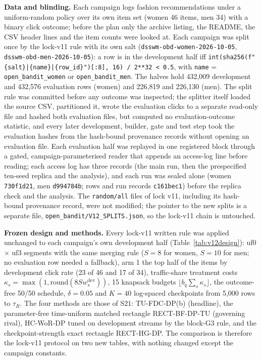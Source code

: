 \documentclass[sigconf,anonymous,review]{acmart}
\begin{document}
\textbf{Data and blinding.} Each campaign logs fashion recommendations under a uniform-random policy over its own item set (women 46 items, men 34) with a binary click outcome; before the plan only the archive listing, the README, the CSV header lines and the item counts were looked at. Each campaign was split once by the lock-v11 rule with its own salt (\texttt{dsswm-obd-women-2026-10-05}, \texttt{dsswm-obd-men-2026-10-05}): a row is in the development half iff \texttt{int(sha256(f"\{salt\}|\{name\}|\{row\_id\}")[:8], 16) / 2**32 < 0.5}, with \texttt{name} = \texttt{open\_bandit\_women} or \texttt{open\_bandit\_men}. The halves hold 432,009 development and 432,576 evaluation rows (women) and 226,819 and 226,130 (men). The split rule was committed before any outcome was inspected; the splitter itself loaded the source CSV, partitioned it, wrote the evaluation clicks to a separate read-only file and hashed both evaluation files, but computed no evaluation-outcome statistic, and every later development, builder, gate and test step took the evaluation hashes from the hash-bound provenance records without opening an evaluation file. Each evaluation half was replayed in one registered block through a gated, campaign-parameterised reader that appends an access-log line before reading; each access log has three records (the main run, then the prespecified ten-seed replica and the analysis), and each run was sealed alone (women \texttt{730f1d21}, men \texttt{d994784b}; rows and run records \texttt{c161bec1}) before the replica check and the analysis. The \texttt{random/all} files of lock v11, including its hash-bound provenance record, were not modified; the pointer to the new splits is a separate file, \texttt{open\_bandit/V12\_SPLITS.json}, so the lock-v11 chain is untouched.



\textbf{Frozen design and methods.} Every lock-v11 written rule was applied unchanged to each campaign's own development half (Table~\ref{tab:v12design}): uf0 $\times$ uf3 segments with the same merging rule ($S = 8$ for women, $S = 10$ for men; no evaluation row needed a fallback), arm 1 the top half of the items by development click rate (23 of 46 and 17 of 34), traffic-share treatment costs $\kappa_s = \max(1, \mathrm{round}(8 S w_s^{\text{dev}}))$, 15 knapsack budgets $\lfloor b_q \sum_s \kappa_s \rfloor$, the outcome-free 50/50 schedule, $\delta = 0.05$ and $K = 40$ log-spaced checkpoints from 5,000 rows to $\tau_R$. The four methods are those of S21: TU-FDC-DP(b) (headline), the parameter-free time-uniform matched rectangle RECT-BF-DP-TU (governing rival), HC-WoR-DP tuned on development streams by the block-G3 rule, and the checkpoint-strength exact rectangle RECT-HG-DP. The comparison is therefore the lock-v11 protocol on two new tables, with nothing changed except the campaign constants.
\end{document}
